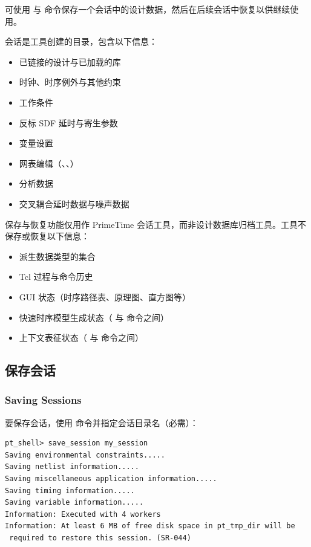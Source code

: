 可使用  与  命令保存一个会话中的设计数据，然后在后续会话中恢复以供继续使用。

会话是工具创建的目录，包含以下信息：
\begin{itemize}
  \item 已链接的设计与已加载的库
  \item 时钟、时序例外与其他约束
  \item 工作条件
  \item 反标 SDF 延时与寄生参数
  \item 变量设置
  \item 网表编辑（、、）
  \item 分析数据
  \item 交叉耦合延时数据与噪声数据
\end{itemize}

保存与恢复功能仅用作 PrimeTime 会话工具，而非设计数据库归档工具。工具不保存或恢复以下信息：
\begin{itemize}
  \item 派生数据类型的集合
  \item Tcl 过程与命令历史
  \item GUI 状态（时序路径表、原理图、直方图等）
  \item 快速时序模型生成状态（ 与  命令之间）
  \item 上下文表征状态（ 与  命令之间）
\end{itemize}

\subsection{保存会话}
\subsubsection*{Saving Sessions}

要保存会话，使用  命令并指定会话目录名（必需）：
\begin{lstlisting}
pt_shell> save_session my_session
Saving environmental constraints.....
Saving netlist information.....
Saving miscellaneous application information.....
Saving timing information.....
Saving variable information.....
Information: Executed with 4 workers
Information: At least 6 MB of free disk space in pt_tmp_dir will be
 required to restore this session. (SR-044)
\end{lstlisting}

